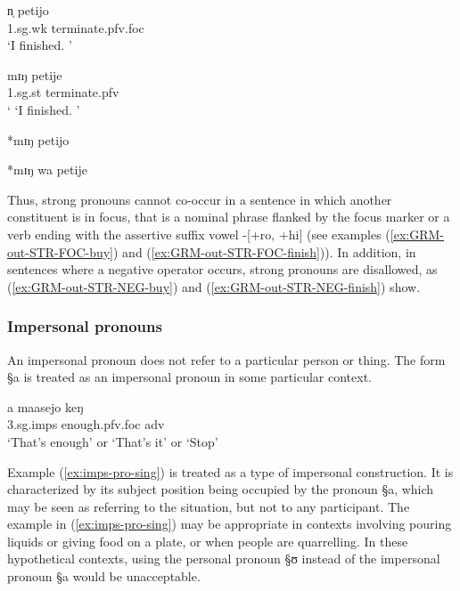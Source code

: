   \begin{exe}
  \ex\label{ex:GRM-weak-strong-verb}
   \begin{xlist}

   
   \ex\label{ex:}
\gll    n̩   petijo\\
    {\sc 1.sg.wk}  {terminate.{\sc pfv.foc}}  \\
\glt  `I finished. ' 


   \ex\label{ex:}
\gll    mɪŋ   petije\\
     {\sc  1.sg.st} {terminate.{\sc pfv}} \\
\glt  ` `I finished. '  

   \ex\label{ex:GRM-out-STR-FOC-finish}
  *mɪŋ   petijo

   \ex\label{ex:GRM-out-STR-NEG-finish}
  *mɪŋ   wa petije
         
   \end{xlist}
  \end{exe}

Thus, strong pronouns cannot co-occur in a sentence in which another
constituent is in focus, that is a nominal phrase  flanked by the focus
marker  or   a
verb ending with the assertive suffix vowel   {\sc -[+ro,  +hi]}    (see
examples 
(\ref{ex:GRM-out-STR-FOC-buy}) and (\ref{ex:GRM-out-STR-FOC-finish})). In
addition,  in
sentences 
where a negative operator occurs, strong pronouns are disallowed, as  
(\ref{ex:GRM-out-STR-NEG-buy}) and   (\ref{ex:GRM-out-STR-NEG-finish}) show.

  
  
  
 \subsubsection{Impersonal pronouns}
 \label{sec:GRM-impers-pro}

An impersonal pronoun does  not refer to a particular person or thing. The form
{\S a} is treated as an impersonal pronoun  in some
particular context.

               
\begin{exe} 
\ex\label{ex:imps-pro-sing}
\gll a maasejo keŋ\\
     {\sc 3.sg.imps}  enough.{\sc pfv.foc} {\sc adv}\\
\glt `That's enough' or `That's it' or `Stop'
\end{exe}

Example (\ref{ex:imps-pro-sing}) is treated as a type of impersonal
construction. It is characterized by its  subject position being  occupied by 
the
pronoun {\S a}, which may be seen as referring to the situation,  but not to any
participant. The example in  (\ref{ex:imps-pro-sing}) may
be appropriate in contexts involving pouring  liquids or giving food on a plate,
or when people are quarrelling. In these hypothetical contexts, using the
personal
pronoun {\S ʊ} instead of  the  impersonal pronoun  {\S a} would be
unacceptable.  

